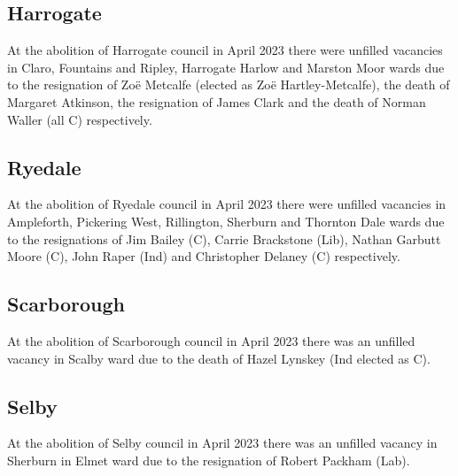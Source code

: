 \documentclass[a4paper,openany]{book}
\begin{document}
\begin{resultsiii}
\subsection*{Harrogate}

At the abolition of Harrogate council in April 2023 there were unfilled vacancies in Claro, Fountains and Ripley, Harrogate Harlow and Marston Moor wards due to the resignation of Zoë Metcalfe (elected as Zoë Hartley-Metcalfe), the death of Margaret Atkinson, the resignation of James Clark and the death of Norman Waller (all C) respectively.%
%
%
%

\subsection*{Ryedale}

At the abolition of Ryedale council in April 2023 there were unfilled vacancies in Ampleforth, Pickering West, Rillington, Sherburn and Thornton Dale wards due to the resignations of Jim Bailey (C), Carrie Brackstone (Lib), Nathan Garbutt Moore (C), John Raper (Ind) and Christopher Delaney (C) respectively.%
%
%
%
%

\subsection*{Scarborough}

At the abolition of Scarborough council in April 2023 there was an unfilled vacancy in Scalby ward due to the death of Hazel Lynskey (Ind elected as C).%

\subsection*{Selby}

At the abolition of Selby council in April 2023 there was an unfilled vacancy in Sherburn in Elmet ward due to the resignation of Robert Packham (Lab).%


\end{resultsiii}
\end{document}
